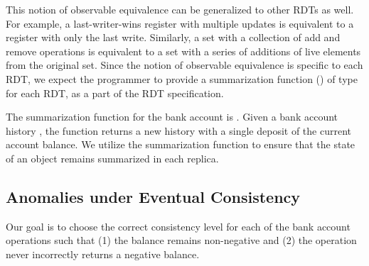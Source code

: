 This notion of observable equivalence can be generalized to other RDTs as well.
For example, a last-writer-wins register with multiple updates is equivalent to
a register with only the last write. Similarly, a set with a collection of add
and remove operations is equivalent to a set with a series of additions of live
elements from the original set. Since the notion of observable equivalence is
specific to each RDT, we expect the programmer to provide a summarization
function () of type \cf{[e] -> [e]} for each RDT, as a part of
the RDT specification.

The summarization function for the bank account is . Given a bank account history
, the  function returns a new history with a single
deposit of the current account balance. We utilize the summarization function
to ensure that the state of an object remains summarized in each replica.

\subsection{Anomalies under Eventual Consistency}

Our goal is to choose the correct consistency level for each of the bank
account operations such that (1) the balance remains non-negative and (2) the
 operation never incorrectly returns a negative balance.

